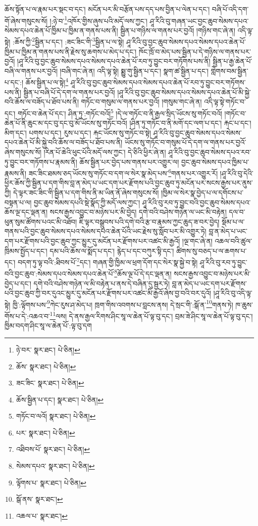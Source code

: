 ཆོས་སྟོན་པ་ལ་རྣམ་པར་སྡང་བ་དང་། མངོན་པར་མི་བརྩོན་པས་དད་པས་བྱིན་པ་ལེན་པ་དང་། བཞི་པོ་འདི་དག་གོ་ཞེས་གསུངས་སོ། །:ཉེ་བ་\footnote{ཉེ་བར་  སྣར་ཐང་།  པེ་ཅིན། }འཁོར་གྱིས་ཞུས་པའི་མདོ་ལས་ཀྱང་། ཤཱ་རིའི་བུ་གཞན་ཡང་བྱང་ཆུབ་སེམས་དཔའ་སེམས་དཔའ་ཆེན་པོ་ཁྱིམ་པ་ཁྱིམ་ན་གནས་པས་ནི། སྦྱིན་པ་གཉིས་ལ་གནས་པར་བྱའོ། །གཉིས་གང་ཞེ་ན། འདི་ལྟ་སྟེ། :ཆོས་ཀྱི་\footnote{ཆོས་  སྣར་ཐང་།  པེ་ཅིན། }སྦྱིན་པ་དང་། :ཟང་ཟིང་གི་\footnote{ཟང་ཟིང་  སྣར་ཐང་།  པེ་ཅིན། }སྦྱིན་པ་ལ་སྟེ། ཤཱ་རིའི་བུ་བྱང་ཆུབ་སེམས་དཔའ་སེམས་དཔའ་ཆེན་པོ་ཁྱིམ་པ་ཁྱིམ་ན་གནས་པས་ནི་རྗེས་སུ་ཆགས་པ་མེད་པ་དང་། ཁོང་ཁྲོ་བ་མེད་པས་སྦྱིན་པ་དེ་གཉིས་ལ་གནས་པར་བྱའོ། །ཤཱ་རིའི་བུ་བྱང་ཆུབ་སེམས་དཔའ་སེམས་དཔའ་ཆེན་པོ་རབ་ཏུ་བྱུང་བར་གཏོགས་པས་ནི། སྦྱིན་པ་རྒྱ་ཆེན་པོ་བཞི་ལ་གནས་པར་བྱའོ། །བཞི་གང་ཞེ་ན། འདི་ལྟ་སྟེ། སྨྱུ་གུ་སྦྱིན་པ་དང་། སྣག་ཚ་སྦྱིན་པ་དང་། གླེགས་བམ་སྦྱིན་པ་དང་:། ཆོས་སྦྱིན་པ་ལ་སྟེ།\footnote{ཆོས་སྦྱིན་པ་དང་།  སྣར་ཐང་།  པེ་ཅིན། } ཤཱ་རིའི་བུ་བྱང་ཆུབ་སེམས་དཔའ་སེམས་དཔའ་ཆེན་པོ་རབ་ཏུ་བྱུང་བར་གཏོགས་པས་ནི། སྦྱིན་པ་བཞི་པོ་དེ་དག་ལ་གནས་པར་བྱའོ། །ཤཱ་རིའི་བུ་བྱང་ཆུབ་སེམས་དཔའ་སེམས་དཔའ་ཆེན་པོ་མི་སྐྱེ་བའི་ཆོས་ལ་བཟོད་པ་ཐོབ་པས་ནི། གཏོང་བ་གསུམ་ལ་གནས་པར་བྱའོ། །གསུམ་གང་ཞེ་ན། འདི་ལྟ་སྟེ་གཏོང་བ་དང་། གཏོང་བ་ཆེན་པོ་དང་། ཤིན་ཏུ་:གཏོང་བའོ།\footnote{གཏོང་བ་ལའོ།  སྣར་ཐང་།  པེ་ཅིན། } །དེ་ལ་གཏོང་བ་ནི་རྒྱལ་སྲིད་ཡོངས་སུ་གཏོང་བའོ། །གཏོང་བ་ཆེན་པོ་ནི་ཆུང་མ་དང་བུ་དང་བུ་མོ་ཡོངས་སུ་གཏོང་བའོ། །ཤིན་ཏུ་གཏོང་བ་ནི་མགོ་དང་ལག་པ་དང་། རྐང་པ་དང་། མིག་དང་། པགས་པ་དང་། རུས་པ་དང་། རྐང་ཡོངས་སུ་གཏོང་བ་སྟེ། ཤཱ་རིའི་བུ་བྱང་ཆུབ་སེམས་དཔའ་སེམས་དཔའ་ཆེན་པོ་མི་སྐྱེ་བའི་ཆོས་ལ་བཟོད་པ་ཐོབ་པས་ནི། ཡོངས་སུ་གཏོང་བ་གསུམ་པོ་དེ་དག་ལ་གནས་པར་བྱའོ་ཞེས་གསུངས་སོ། །རིན་པོ་ཆེའི་ཕུང་པོའི་མདོ་ལས་ཀྱང་། དེ་ཅིའི་ཕྱིར་ཞེ་ན། ཤཱ་རིའི་བུ་བྱང་ཆུབ་སེམས་དཔའ་རབ་ཏུ་བྱུང་བར་གཏོགས་པ་རྣམས་ནི། ཆོས་སྦྱིན་པར་བྱེད་པས་གནས་པར་འགྱུར་ལ། བྱང་ཆུབ་སེམས་དཔའ་ཁྱིམ་པ་རྣམས་ནི། ཟང་ཟིང་ཐམས་ཅད་ཡོངས་སུ་གཏོང་བ་དག་ལ་སེར་སྣ་མེད་པས་\footnote{པར་  སྣར་ཐང་།  པེ་ཅིན། }གནས་པར་འགྱུར་རོ། །ཤཱ་རིའི་བུ་དེའི་ཕྱིར་ཆོས་ཀྱི་སྦྱིན་པ་དག་གིས་བླ་ན་མེད་པ་ཡང་དག་པར་རྫོགས་པའི་བྱང་ཆུབ་ཏུ་མངོན་པར་སངས་རྒྱས་པར་ནུས་ཀྱི། དེ་ལྟར་ཟང་ཟིང་གི་སྦྱིན་པ་དག་གིས་ནི་མ་ཡིན་ནོ་ཞེས་གསུངས་སོ། །ཁྱིམ་ལ་སེར་སྣ་བྱེད་པ་ལ་དགོངས་པ་བསྟན་པ་ལ། བྱང་ཆུབ་སེམས་དཔའི་སྡེ་སྣོད་ཀྱི་མདོ་ལས་ཀྱང་། ཤཱ་རིའི་བུ་རབ་ཏུ་བྱུང་བའི་བྱང་ཆུབ་སེམས་དཔའ་ཆོས་ལྔ་དང་ལྡན་ན། སངས་རྒྱས་འབྱུང་བ་མཉེས་པར་མི་བྱེད། དགེ་བའི་བཤེས་གཉེན་ལ་ཡང་མི་བརྟེན། དལ་བ་ཕུན་སུམ་ཚོགས་པའང་མི་འཐོབ། ཇི་ལྟར་བསྒྲུབས་པའི་དགེ་བའི་རྩ་བ་རྣམས་ཀྱང་ཆུད་ཟ་བར་བྱེད། སྡོམ་པ་ལ་གནས་པའི་བྱང་ཆུབ་སེམས་དཔའ་སེམས་དཔའ་ཆེན་པོའི་ཡང་རྗེས་སུ་སློབ་པར་མི་འགྱུར་ཏེ། བླ་ན་མེད་པ་ཡང་དག་པར་རྫོགས་པའི་བྱང་ཆུབ་ཀྱང་མྱུར་དུ་མངོན་པར་རྫོགས་པར་འཚང་མི་རྒྱའོ། །ལྔ་གང་ཞེ་ན། འཆལ་བའི་ཚུལ་ཁྲིམས་སྤྱོད་པ་དང་། དམ་པའི་ཆོས་ལ་སྨོད་པ་དང་། རྙེད་པ་དང་བཀུར་སྟི་དང་། ཚིགས་སུ་བཅད་པ་ལ་ཆགས་པ་དང་། བདག་ཏུ་ལྟ་བའི་:ཐིབས་པོ་\footnote{འཐིབས་པོ་  སྣར་ཐང་།  པེ་ཅིན། }དང་། གཞན་གྱི་ཁྱིམ་ལ་ཕྲག་དོག་དང་སེར་སྣ་སྐྱེ་བ་སྟེ། ཤཱ་རིའི་བུ་རབ་ཏུ་བྱུང་བའི་བྱང་ཆུབ་:སེམས་དཔའ་སེམས་དཔའ་ཆེན་པོ་\footnote{སེམས་དཔའ་  སྣར་ཐང་།  པེ་ཅིན། }ཆོས་ལྔ་པོ་དེ་དང་ལྡན་ན། སངས་རྒྱས་འབྱུང་བ་མཉེས་པར་མི་བྱེད་པ་དང་། དགེ་བའི་བཤེས་གཉེན་ལ་མི་བརྟེན་པ་ནས་དེ་བཞིན་དུ་སྦྱར་ཏེ། བླ་ན་མེད་པ་ཡང་དག་པར་རྫོགས་པའི་བྱང་ཆུབ་ཀྱི་བར་དུའང་མྱུར་དུ་མངོན་པར་རྫོགས་པར་འཚང་མི་རྒྱའོ་ཞེས་བྱ་བའི་བར་དུའོ། །ཤཱ་རིའི་བུ་འདི་ལྟ་སྟེ། ཁྱི་:ལྟོགས་པས་\footnote{ལྟོགས་པ་  སྣར་ཐང་།  པེ་ཅིན། }ཀེང་རུས་ཤ་མེད་པ། ཁྲག་གིས་འབགས་པ་བླངས་ནས། དེ་སྲང་གི་:སྒོ་ན་\footnote{སྒོ་ནས་  སྣར་ཐང་། }གནས་ཏེ། ཁ་ཆུས་གོས་པ་དེ་:འཆའ་བ་\footnote{འཆལ་པ་  སྣར་ཐང་། }ལས། དེ་ནས་རྒྱལ་རིགས་ཤིང་སཱ་ལ་ཆེན་པོ་ལྟ་བུ་དང་། བྲམ་ཟེ་ཤིང་སཱ་ལ་ཆེན་པོ་ལྟ་བུ་དང་། ཁྱིམ་བདག་ཤིང་སཱ་ལ་ཆེན་པོ་:ལྟ་བུ་དག 
